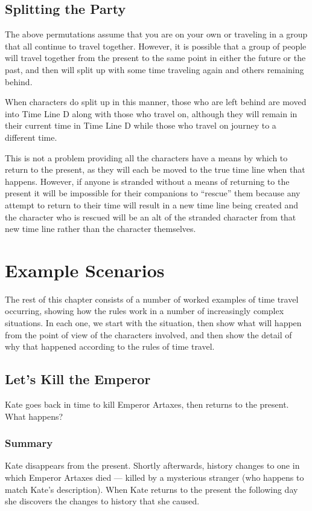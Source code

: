 \begin{multicols*}{2}

\subsection{Splitting the Party}
The above permutations assume that you are on your own or traveling in a group that all continue to travel together. However, it is possible that a group of people will travel together from the present to the same point in either the future or the past, and then will split up with some time traveling again and others remaining behind.

When characters do split up in this manner, those who are left behind are moved into Time Line D along with those who travel on, although they will remain in their current time in Time Line D while those who travel on journey to a different time.

This is not a problem providing all the characters have a means by which to return to the present, as they will each be moved to the true time line when that happens. However, if anyone is stranded without a means of returning to the present it will be impossible for their companions to “rescue” them because any attempt to return to their time will result in a new time line being created and the character who is rescued will be an alt of the stranded character from that new time line rather than the character themselves.

\section{Example Scenarios}
The rest of this chapter consists of a number of worked examples of time travel occurring, showing how the rules work in a number of increasingly complex situations. In each one, we start with the situation, then show what will happen from the point of view of the characters involved, and then show the detail of why that happened according to the rules of time travel. 

\subsection{Let’s Kill the Emperor}
Kate goes back in time to kill Emperor Artaxes, then returns to the present. What happens?

\subsubsection{Summary}
Kate disappears from the present. Shortly afterwards, history changes to one in which Emperor Artaxes died — killed by a mysterious stranger (who happens to match Kate’s description). When Kate returns to the present the following day she discovers the changes to history that she caused.


\end{multicols*}
